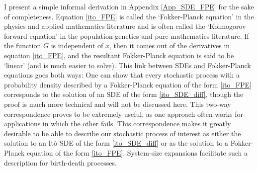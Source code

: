 I present a simple informal derivation in Appendix \ref{App_SDE_FPE} for the sake of completeness. Equation \eqref{ito_FPE} is called the `Fokker-Planck equation' in the physics and applied mathematics literature \citep{gardiner_stochastic_2009} and is often called the `Kolmogorov forward equation' in the population genetics \citep{ewens_mathematical_2004} and pure mathematics \citep{oksendal_stochastic_1998} literature. If the function $G$ is independent of $x$, then it comes out of the derivatives in equation \eqref{ito_FPE}, and the resultant Fokker-Planck equation is said to be `linear' (and is much easier to solve). This link between SDEs and Fokker-Planck equations goes both ways: One can show that every stochastic process with a probability density described by a Fokker-Planck equation of the form \eqref{ito_FPE} corresponds to the solution of an SDE of the form \eqref{ito_SDE_diff}, though the proof is much more technical and will not be discussed here. This two-way correspondence proves to be extremely useful, as one approach often works for applications in which the other fails. This correspondence makes it greatly desirable to be able to describe our stochastic process of interest as either the solution to an It\^o SDE of the form \eqref{ito_SDE_diff} or as the solution to a Fokker-Planck equation of the form \eqref{ito_FPE}. System-size expansions facilitate such a description for birth-death processes.

